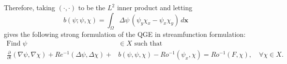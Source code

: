 Therefore, taking $(\cdot,\cdot)$ to be the $L^2$ inner product and letting
\begin{equation}
  b(\psi; \psi, \chi) = \int_{\Omega}\! \Delta \psi\, (\psi_y \chi_x - \psi_x
  \chi_y)\, d\mathbf{x}
  \label{eqn:b}
\end{equation}
gives the following strong formulation of the QGE in streamfunction formulation:
\begin{equation}
  \begin{split}
    \text{Find } \psi &\in X \text{ such that} \\
    \frac{\partial}{\partial t} (\nabla \psi, \nabla \chi) + Re^{-1} (\Delta
      \psi, \Delta \chi) +& b(\psi,\psi,\chi) - Ro^{-1}(\psi_x,\chi)
      = Ro^{-1} (F,\chi),\quad \forall \chi \in X.
  \end{split}
  \label{eqn:QGEWF}
\end{equation}
